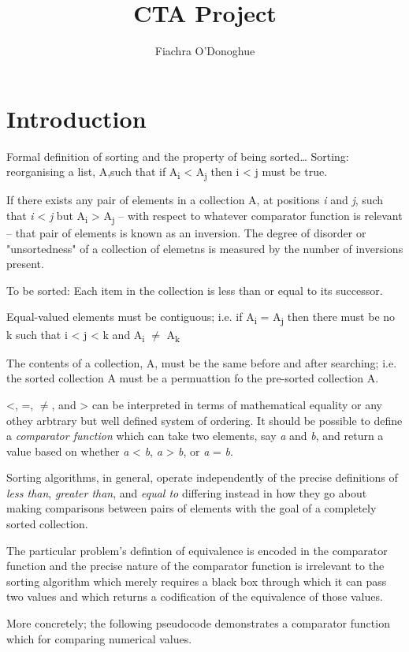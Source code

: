 \documentclass[12pt, a4paper]{article}
\title{CTA Project}
\author{Fiachra O'Donoghue}
\begin{document}
    
\section{Introduction}

Formal definition of sorting and the property of being sorted\dots
Sorting: reorganising a list, A,such that if A\textsubscript{i} < A\textsubscript{j} then i < j must be true.


If there exists any pair of elements in a collection A, at positions \emph{i} and \emph{j}, such that \emph{i} < \emph{j} but A\textsubscript{i} > A\textsubscript{j} -- with respect to whatever comparator function is relevant -- that pair of elements is known as an inversion. The degree of disorder or "unsortedness" of a collection of elemetns is measured by the number of inversions present.

To be sorted: Each item in the collection is less than or equal to its successor.

Equal-valued elements must be contiguous; i.e. if A\textsubscript{i} = A\textsubscript{j} then there must be no k such that i < j < k and A\textsubscript{i} $\ne$ A\textsubscript{k}

The contents of a collection, A, must be the same before and after searching; i.e. the sorted collection A must be a permuattion fo the pre-sorted collection A.

<, =, $\ne$, and > can be interpreted in terms of mathematical equality or any othey arbtrary but well defined system of ordering. It should be possible to define a \emph{comparator function} which can take two elements, say \emph{a} and \emph{b}, and return a value based on whether \emph{a} < \emph{b}, \emph{a} > \emph{b}, or \emph{a} = \emph{b}.

Sorting algorithms, in general, operate independently of the precise definitions of \emph{less than}, \emph{greater than}, and \emph{equal to} differing instead in how they go about making comparisons between pairs of elements with the goal of a completely sorted collection.

The particular problem's defintion of equivalence is encoded in the comparator function and the precise nature of the comparator function is irrelevant to the sorting algorithm which merely requires a black box through which it can pass two values and which returns a codification of the equivalence of those values.

More concretely; the following pseudocode demonstrates a comparator function which for comparing numerical values.
\end{document}
